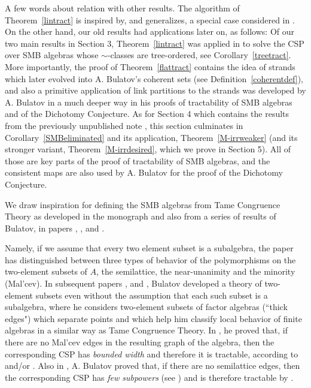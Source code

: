 \documentclass[11pt]{amsart}
\theoremstyle{definition}
\begin{document}
A few words about relation with other results. The algorithm of Theorem~\ref{lintract} is inspired by, and generalizes, a special case considered in \cite{3el}. On the other hand, our old results had applications later on, as follows: Of our two main results in Section 3, Theorem~\ref{lintract} was applied in \cite{M2} to solve the CSP over SMB algebras whose $\sim$-classes are tree-ordered, see Corollary~\ref{treetract}. More importantly, the proof of Theorem~\ref{flattract} contains the idea of strands which later evolved into A. Bulatov's coherent sets (see Definition~\ref{coherentdef}), and also a primitive application of link partitions to the strands was developed by A. Bulatov in a much deeper way in his proofs of tractability of SMB algebras and of the Dichotomy Conjecture. As for Section 4 which contains the results from the previously unpublished note \cite{M2}, this section culminates in Corollary~\ref{SMBeliminated} and its application, Theorem~\ref{M-irrweaker} (and its stronger variant, Theorem~\ref{M-irrdesired}, which we prove in Section 5). All of those are key parts of the proof of tractability of SMB algebras, and the consistent maps are also used by A. Bulatov for the proof of the Dichotomy Conjecture.

We draw inspiration for defining the SMB algebras from Tame Congruence Theory as developed in the monograph \cite{tct} and also from a series of results of Bulatov, in papers \cite{Bulatovcons}, \cite{BulatovGraph1}, \cite{BulatovGraph2} and \cite{BulatovGraph3}. 

Namely, if we assume that every two element subset is a subalgebra, the paper \cite{Bulatovcons} has distinguished between three types of behavior of the polymorphisms on the two-element subsets of $A$, the semilattice, the near-unanimity and the minority (Mal'cev). In subsequent papers  \cite{BulatovGraph1}, \cite{BulatovGraph2} and \cite{BulatovGraph3}, Bulatov developed a theory of two-element subsets even without the assumption that each such subset is a subalgebra, where he considers two-element subsets of factor algebras (``thick edges") which separate points and which help him classify local behavior of finite algebras in a similar way as Tame Congruence Theory. In \cite{BulatovGraph3}, he proved that, if there are no Mal'cev edges in the resulting graph of the algebra, then the corresponding CSP has {\em bounded width} and therefore it is tractable, according to \cite{bk} and/or \cite{barto-collapsewidth}. Also in \cite{BulatovGraph3}, A. Bulatov proved that, if there are no semilattice edges, then the corresponding CSP has {\em few subpowers} (see \cite{BIMMVW}) and is therefore tractable by \cite{IMMVW}.
\end{document}
